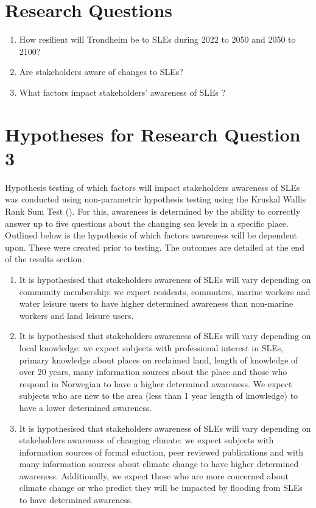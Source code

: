\section{Research Questions}
\begin{enumerate}
    \item How resilient will Trondheim be to SLEs during 2022 to 2050 and 2050 to 2100?
    \item Are stakeholders aware of changes to SLEs?
    \item What factors impact stakeholders’ awareness of SLEs ?
\end{enumerate}



\section{Hypotheses for Research Question 3}
Hypothesis testing  of which factors will impact stakeholders awareness of SLEs was conducted using non-parametric hypothesis testing using the Kruskal Wallis Rank Sum Test (\cite{hollander_nonparametric_2014}). For this, awareness is determined by the ability to correctly answer up to five questions about the changing sea levels in a specific place. Outlined below is the hypothesis of which factors awareness will be dependent upon. These were created prior to testing. The outcomes are detailed at the end of the results section. 

\begin{enumerate}
    \item It is hypothesised that stakeholders awareness of SLEs will vary depending on community membership: we expect residents, commuters, marine workers and water leisure users to have higher determined awareness than non-marine workers and land leisure users.
  
    \item It is hypothesised that stakeholders awareness of SLEs will vary depending on local knowledge: we expect subjects with professional interest in SLEs,  primary knowledge about places on reclaimed land, length of knowledge of over 20 years, many information sources about the place and those who respond in Norwegian to have a higher determined awareness. We expect subjects who are new to the area (less than 1 year length of knowledge) to have a lower determined awareness.

    \item It is hypothesised that stakeholders awareness of SLEs will vary depending on stakeholders awareness of changing climate: we expect subjects with information sources of formal eduction, peer reviewed publications and with many information sources about climate change to have higher determined awareness. Additionally, we expect those who are more concerned about climate change or who predict they will be impacted by flooding from SLEs to have determined awareness. 
\end{enumerate}

